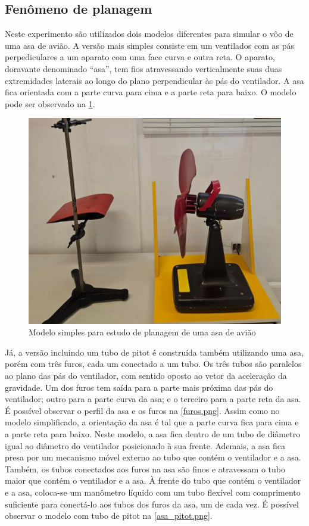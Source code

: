 \subsection{Fenômeno de planagem}
    Neste experimento são utilizados dois modelos diferentes para simular o vôo de uma asa de avião. A versão mais simples consiste em um ventilados com as pás perpediculares a um aparato com uma face curva e outra reta. O aparato, doravante denominado ``asa'', tem fios atravessando verticalmente suas duas extremidades laterais ao longo do plano perpendicular às pás do ventilador. A asa fica orientada com a parte curva para cima e a parte reta para baixo. O modelo pode ser observado na \cref{asa_simples.png}.

    \begin{figure}[H]
        \centering
        \includegraphics[width=0.35\linewidth]{fig/asa_simples.png}
        \caption{Modelo simples para estudo de planagem de uma asa de avião}
        \label{asa_simples.png}
    \end{figure}
    
    Já, a versão incluindo um tubo de pitot é construída também utilizando uma
    asa, porém com três furos, cada um conectado a um tubo. Os três
    tubos são paralelos ao plano das pás do ventilador, com sentido oposto ao
    vetor da aceleração da gravidade. Um dos furos tem saída para a parte mais
    próxima das pás do ventilador; outro para a parte curva da asa; e o terceiro
    para a parte reta da asa. É possível observar o perfil da asa e os furos na
    \cref{furos.png}. Assim como no modelo simplificado, a orientação da asa é
    tal que a parte curva fica para cima e a parte reta para baixo. Neste
    modelo, a asa fica dentro de um tubo de diâmetro igual ao diâmetro do
    ventilador posicionado à sua frente. Ademais, a asa fica presa por um
    mecanismo móvel externo ao tubo que contém o ventilador e a asa. Também, os
    tubos conectados aos furos na asa são finos e atravessam o tubo maior que
    contém o ventilador e a asa. À frente do tubo que contém o ventilador e a
    asa, coloca-se um manômetro líquido com um tubo flexível com comprimento
    suficiente para conectá-lo aos tubos dos furos da asa, um de cada vez. É
    possível observar o modelo com tubo de pitot na \cref{asa_pitot.png}.

